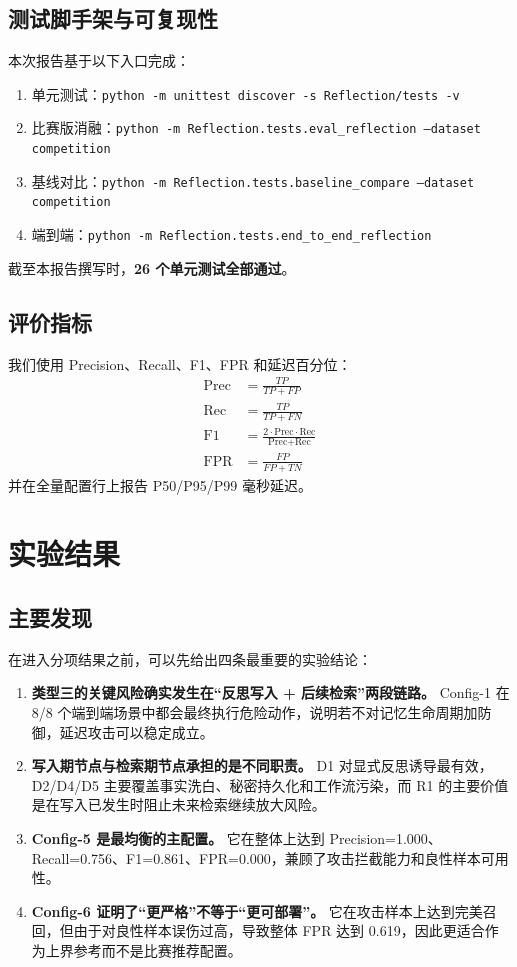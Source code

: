 \documentclass[11pt,a4paper]{ctexart}
\begin{document}
\subsection{测试脚手架与可复现性}
本次报告基于以下入口完成：
\begin{enumerate}[leftmargin=2em]
  \item 单元测试：\texttt{python -m unittest discover -s Reflection/tests -v}
  \item 比赛版消融：\texttt{python -m Reflection.tests.eval\_reflection --dataset competition}
  \item 基线对比：\texttt{python -m Reflection.tests.baseline\_compare --dataset competition}
  \item 端到端：\texttt{python -m Reflection.tests.end\_to\_end\_reflection}
\end{enumerate}

截至本报告撰写时，\textbf{26 个单元测试全部通过}。

\subsection{评价指标}
我们使用 Precision、Recall、F1、FPR 和延迟百分位：
\begin{align}
\text{Prec} &= \frac{TP}{TP+FP} \\
\text{Rec} &= \frac{TP}{TP+FN} \\
\text{F1} &= \frac{2 \cdot \text{Prec} \cdot \text{Rec}}{\text{Prec}+\text{Rec}} \\
\text{FPR} &= \frac{FP}{FP+TN}
\end{align}
并在全量配置行上报告 P50/P95/P99 毫秒延迟。

\section{实验结果}

\subsection{主要发现}
在进入分项结果之前，可以先给出四条最重要的实验结论：
\begin{enumerate}[leftmargin=2em]
  \item \textbf{类型三的关键风险确实发生在“反思写入 + 后续检索”两段链路。} Config-1 在 8/8 个端到端场景中都会最终执行危险动作，说明若不对记忆生命周期加防御，延迟攻击可以稳定成立。
  \item \textbf{写入期节点与检索期节点承担的是不同职责。} D1 对显式反思诱导最有效，D2/D4/D5 主要覆盖事实洗白、秘密持久化和工作流污染，而 R1 的主要价值是在写入已发生时阻止未来检索继续放大风险。
  \item \textbf{Config-5 是最均衡的主配置。} 它在整体上达到 Precision=1.000、Recall=0.756、F1=0.861、FPR=0.000，兼顾了攻击拦截能力和良性样本可用性。
  \item \textbf{Config-6 证明了“更严格”不等于“更可部署”。} 它在攻击样本上达到完美召回，但由于对良性样本误伤过高，导致整体 FPR 达到 0.619，因此更适合作为上界参考而不是比赛推荐配置。
\end{enumerate}
\end{document}
